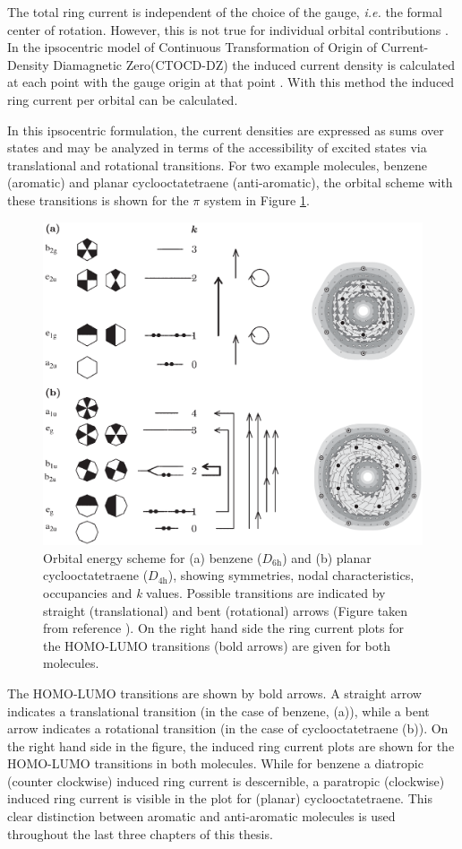 The total ring current is independent of the choice of the gauge, \textit{i.e.} the formal center of rotation. However, this is not true for individual orbital contributions \cite{ipso1}. In the ipsocentric model of Continuous Transformation of Origin of Current-Density Diamagnetic Zero(CTOCD-DZ) the induced current density is calculated at each point with the gauge origin at that point \cite{ipso1,ipso2}. With this method the induced ring current per orbital can be calculated.

In this ipsocentric formulation, the current densities are expressed as sums over states and may be analyzed in terms of the accessibility of excited states via translational and rotational transitions. For two example molecules, benzene (aromatic) and planar cyclooctatetraene (anti-aromatic), the orbital scheme with these transitions is shown for the $\pi$ system in Figure \ref{ch1.fig.orbital_scheme}. 
\begin{figure}
\center
\includegraphics[scale=0.32]{introduction/figures/orbital_scheme.eps}
\caption{Orbital energy scheme for (a) benzene ($D_\mathrm{6h}$) and (b) planar cyclooctatetraene ($D_\mathrm{4h}$), showing symmetries, nodal characteristics, occupancies and \textit{k} values. Possible transitions are indicated by straight (translational) and bent (rotational) arrows (Figure taken from reference \cite{ipso2}). On the right hand side the ring current plots for the HOMO-LUMO transitions (bold arrows) are given for both molecules.}
\label{ch1.fig.orbital_scheme}
\end{figure}
The HOMO-LUMO transitions are shown by bold arrows. A straight arrow indicates a translational transition (in the case of benzene, (a)), while a bent arrow indicates a rotational transition (in the case of cyclooctatetraene (b)). On the right hand side in the figure, the induced ring current plots are shown for the HOMO-LUMO transitions in both molecules. While for benzene a diatropic (counter clockwise) induced ring current is descernible, a paratropic (clockwise) induced ring current is visible in the plot for (planar) cyclooctatetraene. This clear distinction between aromatic and anti-aromatic molecules is used throughout the last three chapters of this thesis.

